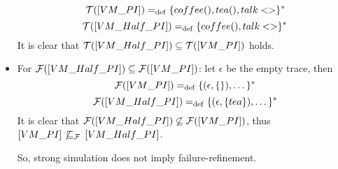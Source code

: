 \begin{prf}
\begin{itemize}
    \[\traces[VM\_PI] \define \{coffee(),tea(),talk<>\}^\ast\]
    \[\traces[VM\_Half\_PI] \define \{coffee(),talk<>\}^\ast\]
It is clear that $\traces[VM\_Half\_PI]\subseteq\traces[VM\_PI]$ holds. 

\item For $\failures[VM\_Half\_PI]\subseteq\failures[VM\_PI]$: let $\epsilon$ be the empty trace, then
    \[\failures[VM\_PI] \define \{(\epsilon,\{\}),\dots\}^\ast\]
    \[\failures[VM\_Half\_PI] \define \{(\epsilon,\{tea\}),\dots\}^\ast\]
It is clear that $\failures[VM\_Half\_PI]\not\subseteq\failures[VM\_PI]$, thus $\ec{VM\_PI} \not\refiF \ec{VM\_Half\_PI}$.

So, strong simulation does not imply failure-refinement. 
\end{itemize}
\end{prf}
